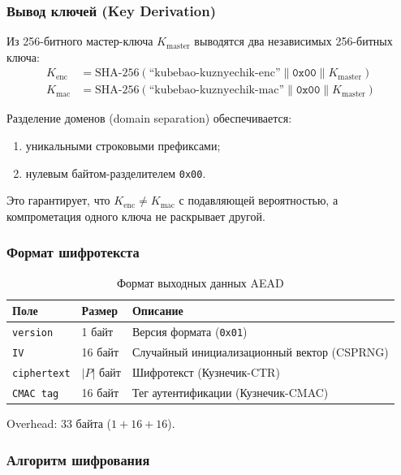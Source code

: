 \documentclass[a4paper,14pt]{extarticle}
\begin{document}
\subsubsection{Вывод ключей (Key Derivation)}

Из 256-битного мастер-ключа $K_{\mathrm{master}}$ выводятся два независимых 256-битных ключа:
\begin{align}
    K_{\mathrm{enc}} &= \mathrm{SHA\text{-}256}(\text{``kubebao-kuznyechik-enc''} \| \texttt{0x00} \| K_{\mathrm{master}}) \\
    K_{\mathrm{mac}} &= \mathrm{SHA\text{-}256}(\text{``kubebao-kuznyechik-mac''} \| \texttt{0x00} \| K_{\mathrm{master}})
\end{align}

Разделение доменов (domain separation) обеспечивается:
\begin{enumerate}
    \item уникальными строковыми префиксами;
    \item нулевым байтом-разделителем \texttt{0x00}.
\end{enumerate}

Это гарантирует, что $K_{\mathrm{enc}} \neq K_{\mathrm{mac}}$ с подавляющей вероятностью, а компрометация одного ключа не раскрывает другой.

\subsubsection{Формат шифротекста}

\begin{table}[h]
\centering
\caption{Формат выходных данных AEAD}
\begin{tabular}{@{}llp{8cm}@{}}
\toprule
\textbf{Поле} & \textbf{Размер} & \textbf{Описание} \\
\midrule
\texttt{version} & 1 байт & Версия формата (\texttt{0x01}) \\
\texttt{IV} & 16 байт & Случайный инициализационный вектор (CSPRNG) \\
\texttt{ciphertext} & $|P|$ байт & Шифротекст (Кузнечик-CTR) \\
\texttt{CMAC tag} & 16 байт & Тег аутентификации (Кузнечик-CMAC) \\
\bottomrule
\end{tabular}
\end{table}

Overhead: 33 байта ($1 + 16 + 16$).

\subsubsection{Алгоритм шифрования}
\end{document}
